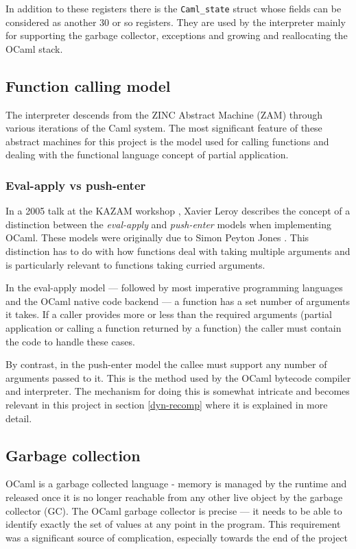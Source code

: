 In addition to these registers there is the \texttt{Caml\_state} struct whose fields can be
considered as another 30 or so registers. They are used by the interpreter mainly for supporting
the garbage collector, exceptions and growing and reallocating the OCaml stack.

\subsection{Function calling model}

The interpreter descends from the ZINC Abstract Machine (ZAM) \cite{zinc} through various
iterations of the Caml system. The most significant feature of these abstract machines for this
project is the model used for calling functions and dealing with the functional language concept
of partial application.

\subsubsection{Eval-apply vs push-enter}

In a 2005 talk at the KAZAM workshop \cite{xavtalk}, Xavier Leroy describes the concept of a
distinction between the \emph{eval-apply} and \emph{push-enter} models when implementing OCaml.
These models were originally due to Simon Peyton Jones \cite{jones}\cite{marlow-jones}. This
distinction has to do with how functions deal with taking multiple arguments and is particularly
relevant to functions taking curried arguments.

In the eval-apply model --- followed by most imperative programming languages and the OCaml native
code backend --- a function has a set number of arguments it takes. If a caller
provides more or less than the required arguments (partial application or calling a function
returned by a function) the caller must contain the code to handle these cases.

By contrast, in the push-enter model the callee must support any number of arguments passed to it.
This is the method used by the OCaml bytecode compiler and interpreter. The mechanism for doing
this is somewhat intricate and becomes relevant in this project in section \ref{dyn-recomp} where
it is explained in more detail.

\subsection{Garbage collection}

OCaml is a garbage collected language - memory is managed by the runtime and released once it is
no longer reachable from any other live object by the garbage collector (GC). The OCaml garbage
collector is precise --- it needs to be able to identify exactly the set of values at any point in
the program. This requirement was a significant source of complication, especially towards the end
of the project

